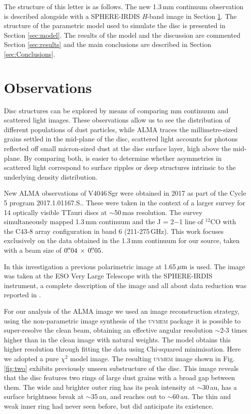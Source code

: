 \documentclass[letters, usenatbib]{mnras}
\begin{document}
The structure of this letter is as follows. The new 1.3\,mm continuum observation is described alongside with a SPHERE-IRDIS \textit{H}-band image in Section \ref{sec:Observations}. The structure of the parametric model used to simulate the disc is presented in Section \ref{sec:model}. The results of the model and the discussion are commented Section \ref{sec:results} and the main conclusions are described in Section \ref{sec:Conclusions}.

\section{Observations} \label{sec:Observations}

Disc structures can be explored by means of comparing mm continuum and scattered light images. These observations allow us to see the distribution of different populations of dust particles, while ALMA traces the millimetre-sized grains settled in the mid-plane of the disc, scattered light accounts for photons reflected off small micron-sized dust at the disc surface layer, high above the mid-plane. By comparing both, is easier to determine whether asymmetries in scattered light correspond to surface ripples or deep structures intrinsic to the underlying density distribution. 

New ALMA observations of V4046\,Sgr were obtained in 2017 as part of the Cycle 5 program 2017.1.01167.S.. These were taken in the context of a larger survey for 14 optically visible TTauri discs at $\sim$50\,mas resolution. The survey simultaneously mapped 1.3\,mm continuum and the J = 2$-$1 line of $^{12}$CO with the C43-8 array configuration in band 6 (211-275\,GHz). This work focuses exclusively on the data obtained in the 1.3\,mm continuum for our source, taken with a beam size of $0\hbox{$.\!\!^{\prime\prime}$}04 \,\times \, 0\hbox{$.\!\!^{\prime\prime}$}05$.

In this investigation a previous polarimetric image at 1.65\,$\hbox{$\mu$m}$ is used. The image was taken at the ESO Very Large Telescope with the SPHERE-IRDIS instrument, a complete description of the image and all about data reduction was reported in \citet{Avenhaus_2018}. 

For our analysis of the ALMA image we used an image reconstruction strategy, using the non-parametric image synthesis of the \textsc{uvmem} package \citep{2006ApJ...639..951C, 2018A&C....22...16C} it is possible to super-resolve the clean beam, obtaining an effective angular resolution $\sim$2-3 times higher than in the clean image with natural weights. The model obtains this higher resolution through fitting the data using Chi-squared minimisation. Here we adopted a pure $\chi ^2$ model image. The resulting \textsc{uvmem} image shown in Fig. \ref{fig:two} exhibits previously unseen substructure of the disc. This image reveals that the disc features two rings of large dust grains with a broad gap between them. The wide and brighter outer ring has its peak intensity at $\sim$30\,au, has a surface brightness break at $\sim$35\,au, and reaches out to $\sim$60\,au. The thin and weak inner ring had never seen before, but \citet{Ru_z_Rodr_guez_2019} did anticipate its existence.
\end{document}
